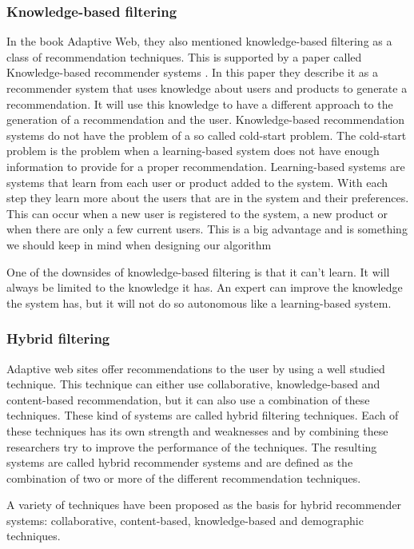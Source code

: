 \subsubsection*{Knowledge-based filtering}
In the book Adaptive Web, they also mentioned knowledge-based filtering as a class of recommendation techniques.
This is supported by a paper called Knowledge-based recommender systems \cite{burke2000knowledge}.
In this paper they describe it as a recommender system that uses knowledge about users and products to generate a recommendation.
It will use this knowledge to have a different approach to the generation of a recommendation and the user.
Knowledge-based recommendation systems do not have the problem of a so called cold-start problem.
The cold-start problem is the problem when a learning-based system does not have enough information to provide for a proper recommendation.
Learning-based systems are systems that learn from each user or product added to the system.
With each step they learn more about the users that are in the system and their preferences.
This can occur when a new user is registered to the system, a new product or when there are only a few current users.
This is a big advantage and is something we should keep in mind when designing our algorithm

One of the downsides of knowledge-based filtering is that it can't learn.
It will always be limited to the knowledge it has.
An expert can improve the knowledge the system has, but it will not do so autonomous like a learning-based system.

\subsubsection*{Hybrid filtering}
Adaptive web sites offer recommendations to the user by using a well studied technique.
This technique can either use collaborative, knowledge-based and content-based recommendation, but it can also use a combination of these techniques.
These kind of systems are called hybrid filtering techniques.
Each of these techniques has its own strength and weaknesses and by combining these researchers try to improve the performance of the techniques.
The resulting systems are called hybrid recommender systems and are defined as the combination of two or more of the different recommendation techniques.

A variety of techniques have been proposed as the basis for hybrid recommender systems: collaborative, content-based, knowledge-based and demographic techniques.

